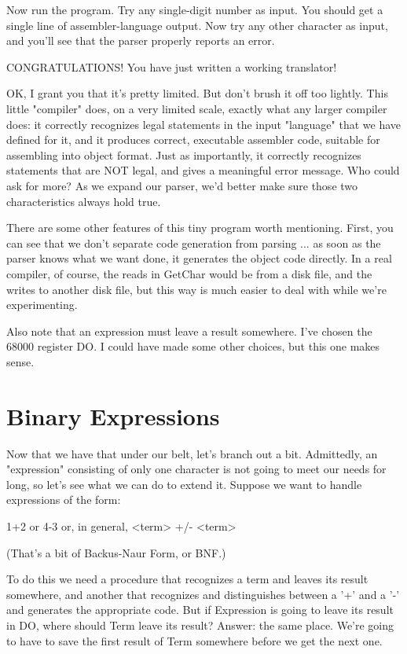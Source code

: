 \documentclass[float=false, crop=false]{standalone}
\begin{document}
Now run the program. Try any single-digit number as input. You should get a
single line of assembler-language output. Now try any other character as input,
and you'll see that the parser properly reports an error.


CONGRATULATIONS! You have just written a working translator!

OK, I grant you that it's pretty limited. But don't brush it off too lightly.
This little "compiler" does, on a very limited scale, exactly what any larger
compiler does: it correctly recognizes legal statements in the input "language"
that we have defined for it, and it produces correct, executable assembler code,
suitable for assembling into object format. Just as importantly, it correctly
recognizes statements that are NOT legal, and gives a meaningful error message.
Who could ask for more? As we expand our parser, we'd better make sure those two
characteristics always hold true.

There are some other features of this tiny program worth mentioning. First, you
can see that we don't separate code generation from parsing ... as soon as the
parser knows what we want done, it generates the object code directly. In a real
compiler, of course, the reads in GetChar would be from a disk file, and the
writes to another disk file, but this way is much easier to deal with while
we're experimenting.

Also note that an expression must leave a result somewhere. I've chosen the
68000 register DO. I could have made some other choices, but this one makes
sense.


\section{Binary Expressions}

Now that we have that under our belt, let's branch out a bit. Admittedly, an
"expression" consisting of only one character is not going to meet our needs for
long, so let's see what we can do to extend it. Suppose we want to handle
expressions of the form:

                         1+2
     or                  4-3
     or, in general, <term> +/- <term>

(That's a bit of Backus-Naur Form, or BNF.)

To do this we need a procedure that recognizes a term and leaves its result
somewhere, and another that recognizes and distinguishes between a '+' and a '-'
and generates the appropriate code. But if Expression is going to leave its
result in DO, where should Term leave its result? Answer: the same place. We're
going to have to save the first result of Term somewhere before we get the next
one.
\end{document}
